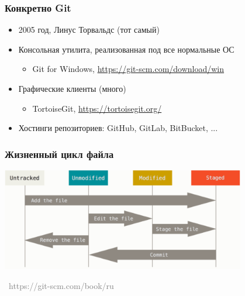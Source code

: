 \documentclass[xetex,mathserif,serif]{beamer}
\newcommand{\attribution}[1] {
    \vspace{-5mm}\begin{flushright}\begin{scriptsize}\textcolor{gray}{\textcopyright\, #1}\end{scriptsize}\end{flushright}
}
\begin{document}
    \begin{frame}
        \frametitle{Конкретно Git}
        \begin{itemize}
            \item 2005 год, Линус Торвальдс (тот самый)
            \item Консольная утилита, реализованная под все нормальные ОС
            \begin{itemize}
                \item Git for Windows, \url{https://git-scm.com/download/win}
            \end{itemize}
            \item Графические клиенты (много)
            \begin{itemize}
                \item TortoiseGit, \url{https://tortoisegit.org/}
            \end{itemize}
            \item Хостинги репозиториев: GitHub, GitLab, BitBucket, ...
        \end{itemize}
    \end{frame}

    \begin{frame}
        \frametitle{Жизненный цикл файла}
        \begin{center}
            \includegraphics[width=0.8\textwidth]{fileLifeCycle.png}
            \attribution{https://git-scm.com/book/ru}
        \end{center}
    \end{frame}
\end{document}
